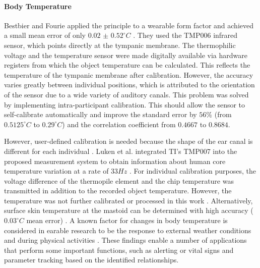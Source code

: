 \paragraph{Body Temperature}
\label{Background:SensingWithEarables:Physiological:BodyTemperature}
Bestbier and Fourie applied the principle to a wearable form factor and achieved a small mean error of only $0.02$ $\pm$ $0.52 ^\circ C$ \cite{bestbierDevelopmentVitalSigns2018}. 
They used the TMP006 infrared sensor, which points directly at the tympanic membrane. 
The thermophilic voltage and the temperature sensor were made digitally available via hardware registers from which the object temperature can be calculated. 
This reflects the temperature of the tympanic membrane after calibration.
However, the accuracy varies greatly between individual positions, which is attributed to the orientation of the sensor due to a wide variety of auditory canals.
This problem was solved by implementing intra-participant calibration.
This should allow the sensor to self-calibrate automatically and improve the standard error by $56\%$ (from $0.5125 ^\circ C$ to $0.29 ^\circ C$) and the correlation coefficient from $0.4667$ to $0.8684$.

However, user-defined calibration is needed because the shape of the ear canal is different for each individual \cite{bestbierDevelopmentVitalSigns2018, luekenPhotoplethysmographybasedInearSensor2017, matsumotoEarbudtypeWearableHearable2019}.
Luken et al. integrated TI's TMP007 into the proposed measurement system to obtain information about human core temperature variation at a rate of $33 Hz$ \cite{luekenPhotoplethysmographybasedInearSensor2017}.
For individual calibration purposes, the voltage difference of the thermopile element and the chip temperature was transmitted in addition to the recorded object temperature.
However, the temperature was not further calibrated or processed in this work \cite{luekenPhotoplethysmographybasedInearSensor2017}.
Alternatively, surface skin temperature at the mastoid can be determined with high accuracy ($0.03 ^\circ C$ mean error) \cite{atallahErgonomicWearableCore2018}.
A known factor for changes in body temperature is considered in earable research to be the response to external weather conditions \cite{barralonAugmentedHearingAssistance2015, boanoNoninvasiveMeasurementCore2013, celikEvaluationBehindtheEarECG2016} and during physical activities \cite{boanoNoninvasiveMeasurementCore2013, chagllae.MeasurementCoreBody2018, celikEvaluationBehindtheEarECG2016, matsumotoEarbudtypeWearableHearable2019, sugimotoDevelopmentWirelessSensing2011}.
These findings enable a number of applications that perform some important functions, such as alerting or vital signs and parameter tracking based on the identified relationships.

